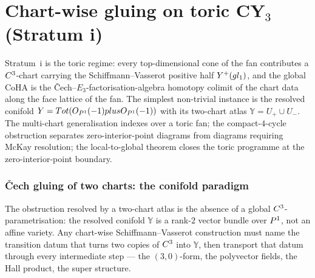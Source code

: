 %

\providecommand{\bY}{\mathbb{Y}}

\part{Chart-wise gluing on toric CY$_3$ (Stratum i)}

\medskip

Stratum~i is the toric regime: every top-dimensional cone of the fan
contributes a $C^3$-chart carrying the Schiffmann--Vasserot positive
half $Y^+(gl_1)$, and the global CoHA is the
\v{C}ech--$E_3$-factorisation-algebra homotopy colimit of the chart
data along the face lattice of the fan.  The simplest non-trivial
instance is the resolved conifold
\(
  \bY = \mathrm{Tot}(\cO_{\bP^1}(-1) \oplus \cO_{\bP^1}(-1))
\)
with its two-chart atlas $\bY = U_+ \cup U_-$.  The multi-chart
generalisation indexes over a toric fan; the compact-$4$-cycle
obstruction separates zero-interior-point diagrams from diagrams
requiring McKay resolution; the local-to-global theorem closes the
toric programme at the zero-interior-point boundary.

\section{\v{C}ech gluing of two charts: the conifold paradigm}
\label{sec:gluing-p2-conifold}

The obstruction resolved by a two-chart atlas is the absence of a global
$C^3$-parametrisation: the resolved conifold $\bY$ is a rank-$2$ vector
bundle over $P^1$, not an affine variety.  Any chart-wise
Schiffmann--Vasserot construction must name the transition datum that turns
two copies of $C^3$ into $\bY$, then transport that datum through every
intermediate step --- the $(3,0)$-form, the polyvector fields, the Hall
product, the super structure.

